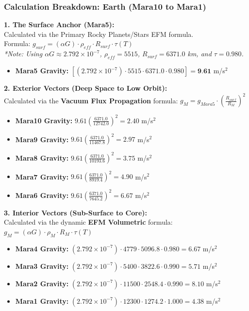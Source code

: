 \documentclass[11pt, a4paper]{article}
\begin{document}
\clearpage
\subsubsection{Calculation Breakdown: Earth (Mara10 to Mara1)}

\noindent \textbf{1. The Surface Anchor (Mara5):} \\
Calculated via the Primary Rocky Planets/Stars EFM formula. \\
Formula: $g_{surf} = (\alpha G) \cdot \rho_{eff} \cdot R_{surf} \cdot \tau(T)$ \\
\textit{*Note: Using $\alpha G \approx 2.792 \times 10^{-7}$, $\rho_{eff} = 5515$, $R_{surf} = 6371.0$ km, and $\tau = 0.980$.}
\begin{itemize}
  \item \textbf{Mara5 Gravity:} $\left[ (2.792 \times 10^{-7}) \cdot 5515 \cdot 6371.0 \cdot 0.980 \right] = \textbf{9.61}$ m/s$^2$
\end{itemize}

\vspace{0.5em}
\noindent \textbf{2. Exterior Vectors (Deep Space to Low Orbit):} \\
Calculated via the \textbf{Vacuum Flux Propagation} formula: $g_M = g_{Mara5} \cdot \left( \frac{R_{surf}}{R_M} \right)^2$
\begin{itemize}
  \item \textbf{Mara10 Gravity:} $9.61 \left( \frac{6371.0}{12742.0} \right)^2 = 2.40$ m/s$^2$
  \item \textbf{Mara9 Gravity:} $9.61 \left( \frac{6371.0}{11467.8} \right)^2 = 2.97$ m/s$^2$
  \item \textbf{Mara8 Gravity:} $9.61 \left( \frac{6371.0}{10193.6} \right)^2 = 3.75$ m/s$^2$
  \item \textbf{Mara7 Gravity:} $9.61 \left( \frac{6371.0}{8919.4} \right)^2 = 4.90$ m/s$^2$
  \item \textbf{Mara6 Gravity:} $9.61 \left( \frac{6371.0}{7645.2} \right)^2 = 6.67$ m/s$^2$
\end{itemize}

\vspace{0.5em}
\noindent \textbf{3. Interior Vectors (Sub-Surface to Core):} \\
Calculated via the dynamic \textbf{EFM Volumetric} formula: $g_M = (\alpha G) \cdot \rho_{M} \cdot R_M \cdot \tau(T)$
\begin{itemize}
  \item \textbf{Mara4 Gravity:} $(2.792 \times 10^{-7}) \cdot 4779 \cdot 5096.8 \cdot 0.980 = 6.67$ m/s$^2$
  \item \textbf{Mara3 Gravity:} $(2.792 \times 10^{-7}) \cdot 5400 \cdot 3822.6 \cdot 0.990 = 5.71$ m/s$^2$
  \item \textbf{Mara2 Gravity:} $(2.792 \times 10^{-7}) \cdot 11500 \cdot 2548.4 \cdot 0.990 = 8.10$ m/s$^2$
  \item \textbf{Mara1 Gravity:} $(2.792 \times 10^{-7}) \cdot 12300 \cdot 1274.2 \cdot 1.000 = 4.38$ m/s$^2$
\end{itemize}
\end{document}
